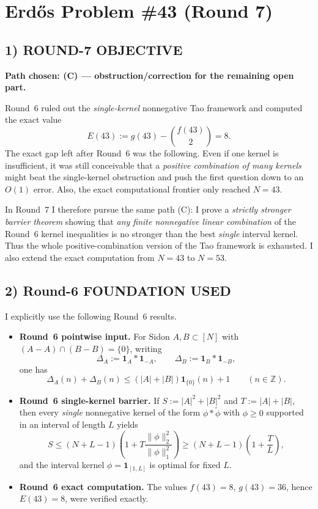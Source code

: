 \section{Erd\H{o}s Problem \#43 (Round 7)}

\subsection{1) ROUND-7 OBJECTIVE}

\textbf{Path chosen: (C) --- obstruction/correction for the remaining open part.}

Round~6 ruled out the \emph{single-kernel} nonnegative Tao framework and computed the exact value
\[
E(43):=g(43)-\binom{f(43)}2=8.
\]
The exact gap left after Round~6 was the following.  Even if one kernel is insufficient, it was still conceivable that a \emph{positive combination of many kernels} might beat the single-kernel obstruction and push the first question down to an $O(1)$ error.  Also, the exact computational frontier only reached $N=43$.

In Round~7 I therefore pursue the same path (C): I prove a \emph{strictly stronger barrier theorem} showing that \emph{any finite nonnegative linear combination} of the Round~6 kernel inequalities is no stronger than the best \emph{single} interval kernel.  Thus the whole positive-combination version of the Tao framework is exhausted.  I also extend the exact computation from $N=43$ to $N=53$.

\subsection{2) Round-6 FOUNDATION USED}

I explicitly use the following Round~6 results.
\begin{itemize}
\item \textbf{Round~6 pointwise input.}  For Sidon $A,B\subset[N]$ with $(A-A)\cap(B-B)=\{0\}$, writing
\[
\Delta_A:=\mathbf 1_A*\mathbf 1_{-A},\qquad \Delta_B:=\mathbf 1_B*\mathbf 1_{-B},
\]
one has
\[
\Delta_A(n)+\Delta_B(n)\le (|A|+|B|)\mathbf 1_{\{0\}}(n)+1
\qquad (n\in\mathbb Z).
\]
\item \textbf{Round~6 single-kernel barrier.}  If $S:=|A|^2+|B|^2$ and $T:=|A|+|B|$, then every \emph{single} nonnegative kernel of the form $\phi*\widetilde\phi$ with $\phi\ge 0$ supported in an interval of length $L$ yields
\[
S\le (N+L-1)\left(1+T\frac{\|\phi\|_2^2}{\|\phi\|_1^2}\right)
\ge (N+L-1)\left(1+\frac{T}{L}\right),
\]
and the interval kernel $\phi=\mathbf 1_{[1,L]}$ is optimal for fixed $L$.
\item \textbf{Round~6 exact computation.}  The values $f(43)=8$, $g(43)=36$, hence $E(43)=8$, were verified exactly.
\end{itemize}

